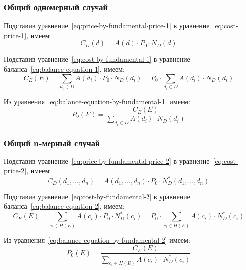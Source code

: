 \subsubsection{Общий одномерный случай}

Подставив уравнение~\ref{eq:price-by-fundamental-price-1} в уравнение~\ref{eq:cost-price-1}, имеем:
\begin{equation}
	C_D(d) = A(d) \cdot P_0 \cdot N_D(d)
	\label{eq:cost-by-fundamental-1}
\end{equation}

Подставив уравнение~\ref{eq:cost-by-fundamental-1} в уравнение баланса~\ref{eq:balance-equation-1}, имеем:
\begin{equation}
	C_E(E) = \sum_{d_i \in D}{A(d_i) \cdot P_0 \cdot N_D(d_i)} = P_0 \cdot \sum_{d_i \in D}{A(d_i) \cdot N_D(d_i)}
	\label{eq:balance-equation-by-fundamental-1}
\end{equation}

Из уравнения~\ref{eq:balance-equation-by-fundamental-1} имеем:
\begin{equation}
	P_0(E) = \frac{C_E(E)}{\sum_{d_i \in D}{A(d_i) \cdot N_D(d_i)}}
	\label{eq:fundamental-price-1}
\end{equation}

\subsubsection{Общий n-мерный случай}

Подставив уравнение~\ref{eq:price-by-fundamental-price-2} в уравнение~\ref{eq:cost-price-2}, имеем:
\begin{equation}
	C_D(d_1, \dots, d_n) = A(d_1, \dots, d_n) \cdot P_0 \cdot N_D^*(d_1, \dots, d_n)
	\label{eq:cost-by-fundamental-2}
\end{equation}

Подставив уравнение~\ref{eq:cost-by-fundamental-2} в уравнение баланса~\ref{eq:balance-equation-2}, имеем:
\begin{equation}
	C_E(E) = \sum_{c_i \in H(E)}{A(c_i) \cdot P_0 \cdot N_D^*(c_i)} = P_0 \cdot \sum_{c_i \in H(E)}{A(c_i) \cdot N_D^*(c_i)}
	\label{eq:balance-equation-by-fundamental-2}
\end{equation}

Из уравнения~\ref{eq:balance-equation-by-fundamental-2} имеем:
\begin{equation}
	P_0(E) = \frac{C_E(E)}{\sum_{c_i \in H(E)}{A(c_i) \cdot N_D^*(c_i)}}
	\label{eq:fundamental-price-2}
\end{equation}

